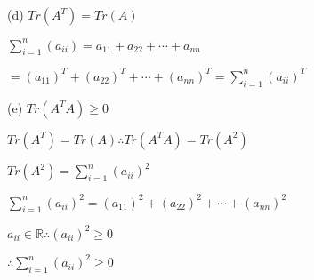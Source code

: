 \documentclass{report}
\begin{document}
(d) $Tr(A^T)=Tr(A)$

	\begin{center}
		$
			\sum\limits_{i=1}^{n}(a_{ii}) = a_{11} + a_{22} + \cdots + a_{nn}
		$ 
	\end{center}
	\begin{center}
		$
			= (a_{11})^T + (a_{22})^T + \cdots + (a_{nn})^T = \sum\limits_{i=1}^n(a_{ii})^T
		$ 
	\end{center}


(e) $Tr(A^TA) \geq 0$
	\begin{center}
		 $
		 	Tr(A^T)=Tr(A) \therefore Tr(A^TA)=Tr(A^2)
		 $
	\end{center}
	
	\begin{center}
		$Tr(A^2) = \sum\limits_{i=1}^n(a_{ii})^2$
	\end{center}
	
	\begin{center}
		$
			\sum\limits_{i=1}^n(a_{ii})^2=(a_{11})^2 + (a_{22})^2 + \cdots + (a_{nn})^2
		$
	\end{center}
	\begin{center}
		$
			a_{ii} \in \mathbb{R} \therefore (a_{ii})^2 \geq 0
		$
	\end{center}
	\begin{center}
		$
			\therefore \sum\limits_{i=1}^n(a_{ii})^2 \geq 0
		$
	\end{center}
	
	
\end{document}
